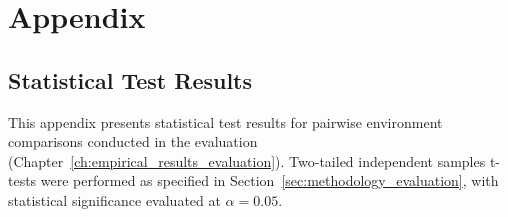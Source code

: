 \renewcommand{\thechapter}{\Alph{chapter}}
\renewcommand{\thesection}{\Alph{section}}
\chapter*{Appendix}
\renewcommand{\thetable}{\thesection.\arabic{table}}
\section{Statistical Test Results}
\label{appendix:statistical_tests}

This appendix presents statistical test results for pairwise environment comparisons conducted in the evaluation (Chapter~\ref{ch:empirical_results_evaluation}).
Two-tailed independent samples t-tests were performed as specified in Section~\ref{sec:methodology_evaluation}, with statistical significance evaluated at $\alpha = 0.05$.

